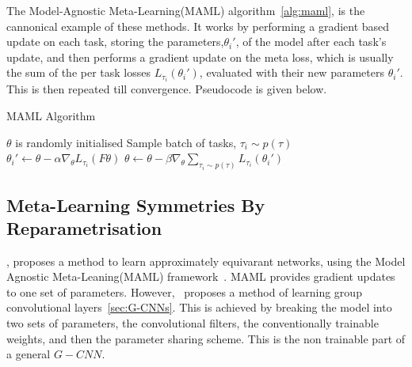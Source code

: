 The Model-Agnostic Meta-Learning(MAML) algorithm~\ref{alg:maml}, is the cannonical example of these methods. It works by performing a gradient based update on each task, storing the parameters,$\theta_i'$, of the model after each task's update, and then performs a gradient update on the meta loss, which is usually the sum of the per task losses $L_{\tau_i}(\theta_i')$, evaluated with their new parameters $\theta_i'$. This is then repeated till convergence. Pseudocode is given below.


\begin{algorithm}
	\caption{MAML Algorithm}
	\label{alg:maml}
	\begin{algorithmic}
		\State $\theta$ is randomly initialised
		\State Sample batch of tasks, $\tau_i \sim p(\tau)$
		\State $\theta_i' \leftarrow \theta - \alpha \nabla_\theta L_{\tau_i}(F\theta)$
		\EndFor
		\State $\theta \leftarrow \theta - \beta \nabla_\theta \sum_{\tau_i \sim p(\tau)}{L_{\tau_i}(\theta_i')}$
		\EndWhile
	\end{algorithmic}
\end{algorithm}


\subsection{Meta-Learning Symmetries By Reparametrisation}
\cite{zhou2020meta}, proposes a method to learn approximately equivarant networks, using the Model Agnostic Meta-Leaning(MAML) framework~\cite{finn2017model}. MAML provides gradient updates to one set of parameters. However,~\cite{zhou2020meta} proposes a method of learning group convolutional layers~\ref{sec:G-CNNs}. This is achieved by breaking the model into two sets of parameters, the convolutional filters, the conventionally trainable weights, and then the parameter sharing scheme. This is the non trainable part of a general $G-CNN$. 
\begin{equation} 
\end{equation}

